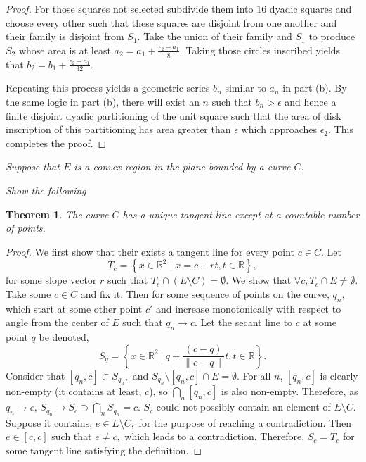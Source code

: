 \documentclass[letter]{article}
\newtheorem{theorem}{Theorem}
\newenvironment{menumerate}{%
  \edef\backupindent{\the\parindent}%
  \enumerate%
  \setlength{\parindent}{\backupindent}%
}{\endenumerate}
\begin{document}
\begin{menumerate}
\begin{menumerate}
\begin{proof}
					For those squares not selected subdivide them into $16$ dyadic squares and choose every other such that these squares are disjoint from one another and their family is disjoint from $S_1.$ Take the union of their family and $S_1$ to produce $S_2$ whose area is at least $a_2 = a_1 + \frac{\epsilon_2-a_1}{8}.$ Taking those circles inscribed yields that $b_2 = b_1 + \frac{\epsilon_2-a_1}{32}.$

					Repeating this process yields a geometric series $b_n$ similar to $a_n$ in part (b). By the same logic in part (b), there will exist an $n$ such that $b_n> \epsilon$ and hence a finite disjoint dyadic partitioning of the unit square such that the area of disk inscription of this partitioning has area greater than $\epsilon$ which approaches $\epsilon_2$. This completes the proof. 
				\end{proof}
			\end{menumerate}

		\setcounter{enumi}{31}
		\item \textit{Suppose that $E$ is a convex region in the plane bounded by a curve $C.$}
			\begin{menumerate}
				\item \textit{Show the following}
					\begin{theorem}
						The curve $C$ has a unique tangent line except at a countable number of points.
					\end{theorem}

					\begin{proof}
						We first show that their exists a tangent line for every point $c\in C.$ Let $$T_c = \left\{x\in\mathbb{R}^2\;|\;x=c+rt, t \in \mathbb{R}\right\}, $$ for some slope vector $r$ such that $T_c \cap (E\setminus C) = \emptyset.$ We show that $\forall c, T_c \cap E \neq \emptyset.$ 
						Take some $c \in C$ and fix it. Then for some sequence of points on the curve, $q_n$, which start at some other point $c'$ and increase monotonically with respect to angle from the center of $E$ such that $q_n \to c.$ Let the secant line to $c$ at some point $q$ be denoted, $$S_q = \left\{x \in \mathbb{R}^2\ |\ q + \frac{(c-q)}{\|c-q\|}t, t\in \mathbb{R}\right\}.$$
						Consider that $[q_n,c] \subset S_{q_n},$ and $ S_{q_n} \setminus {[q_n,c]} \cap E =\emptyset.$ For all $n$, $[q_n,c]$ is clearly non-empty (it contains at least, $c$), so $\bigcap_n[q_n,c]$ is also non-empty. Therefore, as $q_n \to c$, $S_{q_n} \to S_{c} \supset \bigcap_n S_{q_n} = {c}$. $S_c$ could not possibly contain an element of $E \setminus C.$ Suppose it contains, $e \in E \setminus C,$ for the purpose of reaching a contradiction. Then $e \in [c,c]$ such that $e\neq c,$ which leads to a contradiction. Therefore, $S_c = T_c$ for some tangent line satisfying the definition.


\end{proof}
\end{menumerate}
\end{menumerate}
\end{document}
